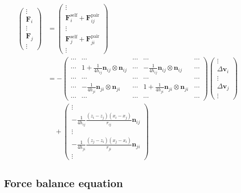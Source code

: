 \documentclass[12pt]{article}
\begin{document}
\begin{align}
\begin{pmatrix}
\vdots \\ \bm{F}_i \\ \vdots \\ \bm{F}_j \\  \vdots  
\end{pmatrix}
& =
\begin{pmatrix}
\vdots \\
\bm{F}_{i}^{\mathrm{self}} +  \bm{F}_{ij}^{\mathrm{pair}}  
\\ \vdots \\ 
\bm{F}_{j}^{\mathrm{self}} +  \bm{F}_{ji}^{\mathrm{pair}}  
\\  \vdots  
\end{pmatrix} \\
&=
-
\begin{pmatrix}
\cdots & \cdots & \cdots & \cdots & \cdots\\
\cdots & 1 + \frac{1}{4h_{ij}}\bm{n}_{ij} \otimes \bm{n}_{ij}  
& \cdots & -\frac{1}{4h_{ij}}\bm{n}_{ij} \otimes \bm{n}_{ij}   & \cdots\\
\cdots & \cdots & \cdots & \cdots & \cdots\\
\cdots & -\frac{1}{4h_{ji}}\bm{n}_{ji} \otimes \bm{n}_{ji} & \cdots 
& 1 + \frac{1}{4h_{ji}}\bm{n}_{ji} \otimes \bm{n}_{ji} 
 & \cdots \\
\cdots & \cdots & \cdots & \cdots & \cdots 
\end{pmatrix}
\begin{pmatrix}
\vdots \\
\Delta \bm{v}_i \\ 
\vdots \\
\Delta \bm{v}_j \\
\vdots 
\end{pmatrix} \\
& \quad 
+ 
\begin{pmatrix}
\vdots \\
-\frac{1}{4h_{ij}}
 \frac{(z_i - z_j )(x_i-x_j)}{r_{ij}} 
 \bm{n}_{ij} \\
\vdots \\
-\frac{1}{4h_{ji}} 
 \frac{(z_j - z_i )(x_j - x_i)}{r_{ji}} 
\bm{n}_{ji} \\
\vdots 
\end{pmatrix} 
\end{align}

\newpage
\subsection*{Force balance equation}





\newpage

\end{document}
